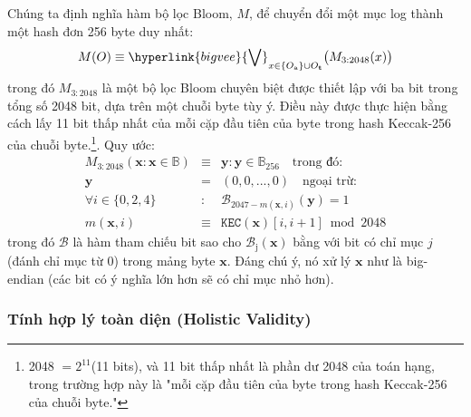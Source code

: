 \documentclass[9pt,oneside]{amsart}
\begin{document}
\begin{multicols}{2}
Chúng ta định nghĩa hàm bộ lọc Bloom, $M$, để chuyển đổi một mục log thành một hash đơn 256 byte duy nhất:
\begin{equation}
M(O) \equiv \hyperlink{bigvee}{\bigvee}_{x \in \{O_{\mathrm{a}}\} \cup O_{\mathbf{t}}} \big( M_{3:2048}(x) \big)
\end{equation}
trong đó $M_{3:2048}$ là một bộ lọc Bloom chuyên biệt được thiết lập với ba bit trong tổng số 2048 bit, dựa trên một chuỗi byte tùy ý. Điều này được thực hiện bằng cách lấy 11 bit thấp nhất của mỗi cặp đầu tiên của byte trong hash Keccak-256 của chuỗi byte.\footnote{2048 $= 2^{11}$(11 bits), và 11 bit thấp nhất là phần dư 2048 của toán hạng, trong trường hợp này là "mỗi cặp đầu tiên của byte trong hash Keccak-256 của chuỗi byte."}. Quy ước:
\begin{eqnarray}
M_{3:2048}(\mathbf{x}: \mathbf{x} \in \mathbb{B}) & \equiv & \mathbf{y}: \mathbf{y} \in \mathbb{B}_{256} \quad \text{trong đó:}\\
\mathbf{y} & = & (0, 0, ..., 0) \quad \text{ngoại trừ:}\\
\forall i \in \{0, 2, 4\}&:&\mathcal{B}_{2047 - m(\mathbf{x}, i)}(\mathbf{y}) = 1\\
m(\mathbf{x}, i) &\equiv& \mathtt{KEC}(\mathbf{x})[i, i + 1] \bmod 2048
\end{eqnarray}
trong đó $\mathcal{B}$ là hàm tham chiếu bit sao cho $\mathcal{B}_{\mathrm{j}}(\mathbf{x})$ bằng với bit có chỉ mục $j$ (đánh chỉ mục từ 0) trong mảng byte $\mathbf{x}$.
Đáng chú ý, nó xử lý $\mathbf{x}$ như là big-endian (các bit có ý nghĩa lớn hơn sẽ có chỉ mục nhỏ hơn).

\subsubsection{Tính hợp lý toàn diện (Holistic Validity)}


\end{multicols}
\end{document}
